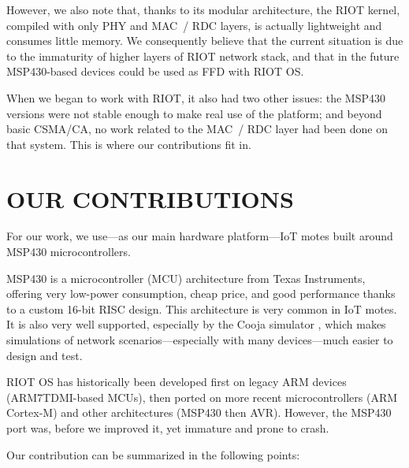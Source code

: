 \documentclass[a4paper,twoside]{article}
\begin{document}
However, we also note that, thanks to its modular architecture, the RIOT
kernel, compiled with only PHY and MAC~/ RDC layers, is actually lightweight
and consumes little memory. We consequently believe that the current
situation is due to the immaturity of higher layers of RIOT network stack,
and that in the future MSP430-based devices could be used as FFD with RIOT OS.

\medskip

When we began to work with RIOT, it also had two other issues: the MSP430
versions were not stable enough to make real use of the platform; and
beyond basic CSMA/CA, no work related to the MAC~/ RDC layer had been
done on that system. This is where our contributions fit in.


\section{\uppercase{Our contributions}}

For our work, we use---as our main hardware platform---IoT motes built
around MSP430 microcontrollers.

MSP430 is a microcontroller (MCU) architecture from Texas Instruments,
offering very low-power consumption, cheap price, and good performance thanks
to a custom 16-bit RISC design. This architecture is very common in IoT motes.
It is also very well supported, especially by the Cooja simulator
\cite{Cooja}, which makes simulations of network scenarios---especially
with many devices---much easier to design and test.

RIOT OS has historically been developed first on legacy ARM devices
(ARM7TDMI-based MCUs), then ported on more recent microcontrollers
(ARM Cortex-M) and other architectures (MSP430 then AVR). However,
the MSP430 port was, before we improved it, yet immature and
prone to crash.

Our contribution can be summarized in the following points:
\end{document}
